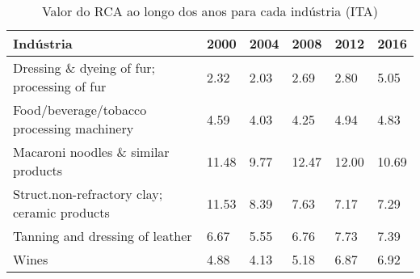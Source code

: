\begin{table}
\centering
\caption{Valor do RCA ao longo dos anos para cada indústria (ITA)}
\begin{tabular}{p{6cm}p{1.5cm}p{1.5cm}p{1.5cm}p{1.5cm}p{1.5cm}}
\toprule
                                   Indústria &  2000 & 2004 &  2008 &  2012 &  2016 \\
\midrule
 Dressing \& dyeing of fur; processing of fur &  2.32 & 2.03 &  2.69 &  2.80 &  5.05 \\
  Food/beverage/tobacco processing machinery &  4.59 & 4.03 &  4.25 &  4.94 &  4.83 \\
         Macaroni noodles \& similar products & 11.48 & 9.77 & 12.47 & 12.00 & 10.69 \\
Struct.non-refractory clay; ceramic products & 11.53 & 8.39 &  7.63 &  7.17 &  7.29 \\
             Tanning and dressing of leather &  6.67 & 5.55 &  6.76 &  7.73 &  7.39 \\
                                       Wines &  4.88 & 4.13 &  5.18 &  6.87 &  6.92 \\
\bottomrule
\end{tabular}
\end{table}
